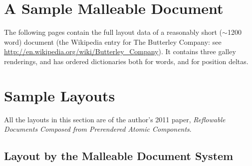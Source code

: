 

%


\cleardoublepage
\chapter{A Sample Malleable Document}
\label{app:sampledoc}

The following pages contain the full layout data of a reasonably short ($\sim$1200 word) document (the Wikipedia entry for The Butterley Company: see \url{http://en.wikipedia.org/wiki/Butterley_Company}). It contains three galley renderings, and has ordered dictionaries both for words, and for position deltas.





\cleardoublepage
\chapter{Sample Layouts}
\label{app:layouts}

All the layouts in this section are of the author's 2011 paper, \emph{Reflowable Documents Composed from Prerendered Atomic Components}.\cite{Pinkney2011}

\section{Layout by the Malleable Document System}

